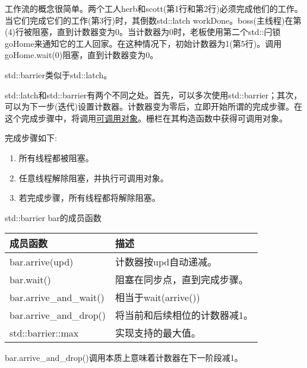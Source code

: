 工作流的概念很简单。两个工人herb和scott(第1行和第2行)必须完成他们的工作。当它们完成它们的工作(第3行)时，其倒数std::latch workDone。boss(主线程)在第(4)行被阻塞，直到计数器变为0。当计数器为0时，老板使用第二个std::闩锁goHome来通知它的工人回家。在这种情况下，初始计数器为1(第5行)。调用goHome.wait(0)阻塞，直到计数器变为0。


std::barrier类似于std::latch。


std::latch和std::barrier有两个不同之处。首先，可以多次使用std::barrier；其次，可以为下一步(迭代)设置计数器。计数器变为零后，立即开始所谓的完成步骤。在这个完成步骤中，将调用\href{https://en.cppreference.com/w/cpp/named_req/Callable}{可调用对象}。栅栏在其构造函数中获得可调用对象。

完成步骤如下:

\begin{enumerate}
\item 
所有线程都被阻塞。

\item 
任意线程解除阻塞，并执行可调用对象。

\item 
若完成步骤，所有线程都将解除阻塞。
\end{enumerate}

\begin{center}
std::barrier bar的成员函数
\end{center}

\begin{longtable}[c]{|l|l|}
\hline
\textbf{成员函数} & \textbf{描述}                           \\ \hline
\endfirsthead
%
\endhead
%
bar.arrive(upd)          & 计数器按upd自动递减。          \\ \hline
bar.wait()              & 阻塞在同步点，直到完成步骤。  \\ \hline
bar.arrive\_and\_wait()  & 相当于wait(arrive())                  \\ \hline
bar.arrive\_and\_drop() & 将当前和后续相位的计数器减1。\\ \hline
std::barrier::max        & 实现支持的最大值。 \\ \hline
\end{longtable}

bar.arrive\_and\_drop()调用本质上意味着计数器在下一阶段减1。


















